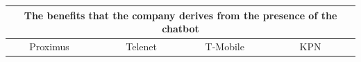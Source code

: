 \begin{table}[!htb]
	\centering
	\begin{tabular}{|lllll|}
		\hline
		\multicolumn{5}{|c|}{\textbf{The benefits that the company derives from the presence of the chatbot}}                                                                                                                                                                                                                                                                                                                                                                                                                                                                                                                                                                                                                                                                                                          \\ \hline
		\multicolumn{1}{|l|}{}                                                                                   & \multicolumn{1}{l|}{Proximus}                                                                                                                                              & \multicolumn{1}{l|}{Telenet}                                                                                                  & \multicolumn{1}{l|}{T-Mobile}                                                                                                                                                                                       & KPN                                                                                                                                                              \\ \hline

\end{tabular}
\end{table}
